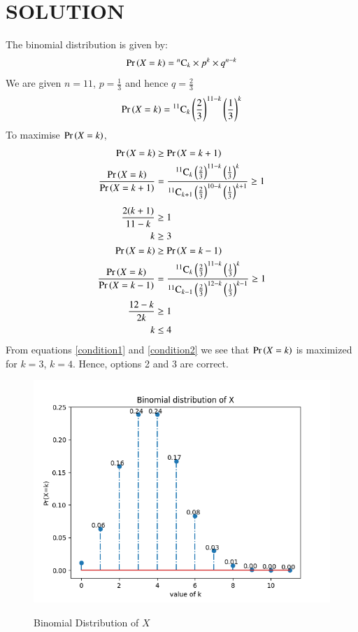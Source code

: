 \documentclass[journal,12pt,twocolumn]{IEEEtran}
\begin{document}
\section{\textbf{SOLUTION}}
The binomial distribution is given by:
\begin{equation}
\Pr\left(X=k\right)={}^{n}\mathrm{C}_{k}\times p^k\times q^{n-k}
\end{equation}
We are given $n=11$, $p=\frac{1}{3}$ and hence $q=\frac{2}{3}$
\begin{align}
\Pr\left(X = k\right)={{}^{11}\mathrm{C}_{k}}\left(\frac{2}{3}\right)^{11-k}\left(\frac{1}{3}\right)^{k}
\end{align}
To maximise $\Pr\left(X = k\right)$,
\begin{align}
\Pr\left(X = k\right)&\geq\Pr\left(X = k+1\right)\\
\frac{\Pr\left(X = k\right)}{\Pr\left(X = k+1\right)}&=\frac{{{}^{11}\mathrm{C}_{k}}\left(\frac{2}{3}\right)^{11-k}\left(\frac{1}{3}\right)^{k}}{{{}^{11}\mathrm{C}_{k+1}}\left(\frac{2}{3}\right)^{10-k}\left(\frac{1}{3}\right)^{k+1}}\geq1
\end{align}
\begin{align}
\frac{2(k+1)}{11-k}&\geq1\\
k&\geq3\label{condition1}\\
\Pr\left(X = k\right)&\geq\Pr\left(X = k-1\right)\\
\frac{\Pr\left(X = k\right)}{\Pr\left(X = k-1\right)}&=\frac{{{}^{11}\mathrm{C}_{k}}\left(\frac{2}{3}\right)^{11-k}\left(\frac{1}{3}\right)^{k}}{{{}^{11}\mathrm{C}_{k-1}}\left(\frac{2}{3}\right)^{12-k}\left(\frac{1}{3}\right)^{k-1}}\geq1\\
\frac{12-k}{2k}&\geq1\\
k&\leq4\label{condition2}
\end{align}
From equations \eqref{condition1} and \eqref{condition2} we see that $\Pr\left(X = k\right)$ is maximized for $k=3$, $k=4$. Hence, options 2 and 3 are correct.
\renewcommand{\thefigure}{1}
\begin{figure}[!htb]
\centering
\includegraphics[width=\columnwidth]{Binomial-stemplot.png}
\label{fig:binom dist}
\caption{Binomial Distribution of  $X$}
\end{figure}
\end{document}
